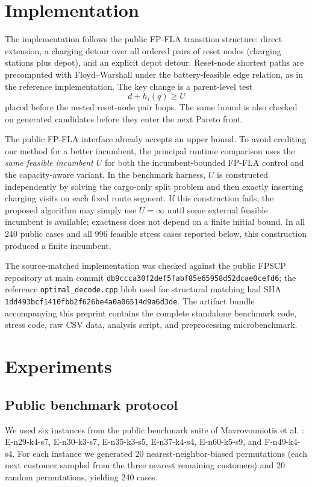 \documentclass[11pt]{article}
\begin{document}
\section{Implementation}
The implementation follows the public FP-FLA transition structure: direct extension, a charging detour over all ordered pairs of reset nodes (charging stations plus depot), and an explicit depot detour. Reset-node shortest paths are precomputed with Floyd--Warshall under the battery-feasible edge relation, as in the reference implementation. The key change is a parent-level test
\[
d+h_i(q)\ge U
\]
placed before the nested reset-node pair loops. The same bound is also checked on generated candidates before they enter the next Pareto front.

The public FP-FLA interface already accepts an upper bound. To avoid crediting our method for a better incumbent, the principal runtime comparison uses the \emph{same feasible incumbent $U$} for both the incumbent-bounded FP-FLA control and the capacity-aware variant. In the benchmark harness, $U$ is constructed independently by solving the cargo-only split problem and then exactly inserting charging visits on each fixed route segment. If this construction fails, the proposed algorithm may simply use $U=\infty$ until some external feasible incumbent is available; exactness does not depend on a finite initial bound. In all 240 public cases and all 996 feasible stress cases reported below, this construction produced a finite incumbent.

The source-matched implementation was checked against the public FPSCP repository at main commit \texttt{db9ccca30f2def5fabf85e65958d52dcae0cefd6}; the reference \texttt{optimal\_decode.cpp} blob used for structural matching had SHA \texttt{1dd493bcf1410fbb2f626be4a0a06514d9a6d3de}. The artifact bundle accompanying this preprint contains the complete standalone benchmark code, stress code, raw CSV data, analysis script, and preprocessing microbenchmark.

\section{Experiments}
\subsection{Public benchmark protocol}
We used six instances from the public benchmark suite of Mavrovouniotis et al. \cite{mavrovouniotis2020}: E-n29-k4-s7, E-n30-k3-s7, E-n35-k3-s5, E-n37-k4-s4, E-n60-k5-s9, and F-n49-k4-s4. For each instance we generated 20 nearest-neighbor-biased permutations (each next customer sampled from the three nearest remaining customers) and 20 random permutations, yielding 240 cases.
\end{document}
